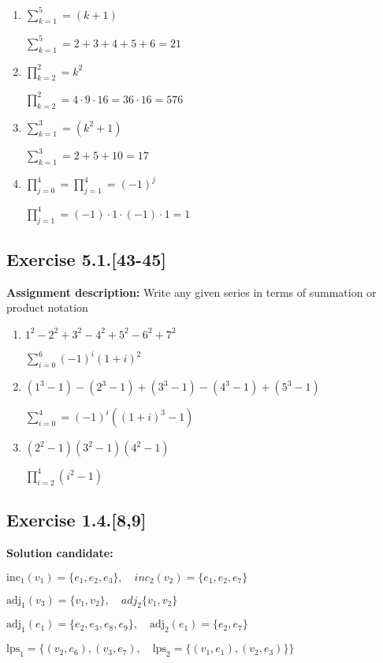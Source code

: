 \documentclass{report}
\newcommand{\cent}[1]{\begin{center}#1\end{center}}
\newcommand{\AssignmentDescription}{\textbf{Assignment description: }}
\newcommand{\Solution}{\textbf{Solution candidate: }}
\newcommand{\Exercise}[1]{\subsection{Exercise #1}}
\newcommand{\parenthesis}[1]{\left( #1 \right)}
\begin{document}
	\begin{enumerate}
		\item $\sum_{k=1}^{5} = (k+1)$
		
		\cent{$\sum_{k=1}^{5} = 2+3+4+5+6 = 21$}
		
		\item $\prod_{k=2}^{2} = k^2$
		
		\cent{$\prod_{k=2}^{2} = 4 \cdot 9 \cdot 16 = 36 \cdot 16 = 576$}
		
		\item $\sum_{k=1}^{3} = \parenthesis{k^2 + 1}$
		
		\cent{$\sum_{k=1}^{3} = 2 + 5 + 10 = 17$}
		
		\item $\prod_{j=0}^{4} = \prod_{j=1}^{4} = (-1)^j   $
		
		\cent{$\prod_{j=1}^{4} =  (-1) \cdot 1 \cdot  (-1) \cdot 1 = 1$}
		
	\end{enumerate}
	
	\Exercise{5.1.[43-45]}
	
	\AssignmentDescription
	Write any given series in terms of summation or product notation
	
	\begin{enumerate}
		\item $1^2 - 2^2 + 3^2 - 4^2 + 5^2 - 6^2 + 7^2$
		
		\cent{$\sum_{i=0}^{6} (-1)^i (1+i)^2$}
		
		\item $(1^3-1)-(2^3-1)+(3^3-1)-(4^3 - 1) + (5^3 -1)$
		
		\cent{$\sum_{i=0}^{4} = (-1)^i \parenthesis{(1+i)^3 -1}$}
		
		\item $\parenthesis{2^2-1}\parenthesis{3^2 -1} \parenthesis{4^2 -1}$
		
		\cent{$\prod_{i=2}^{4} (i^2 -1)$}
		
	\end{enumerate}
	
	\Exercise{1.4.[8,9]}
	\Solution
	\cent{$\text{inc}_1(v_1) = \{e_1,e_2,e_3\}, \quad inc_2(v_2) = \{e_1,e_2,e_7\}$}
	
	\cent{$\text{adj}_1(v_3) = \{v_1,v_2\}, \quad adj_2\{v_1,v_2\}$}
	
	\cent{$\text{adj}_1(e_1) = \{e_2,e_3,e_8,e_9\}, \quad \text{adj}_2(e_1) = \{e_2,e_7\}$}
	
	\cent{$\text{lps}_1 = \{(v_2,e_6),(v_3,e_7), \quad \text{lps}_2 = \{(v_1,e_1),(v_2,e_3)\}\}$}
	
\end{document}
